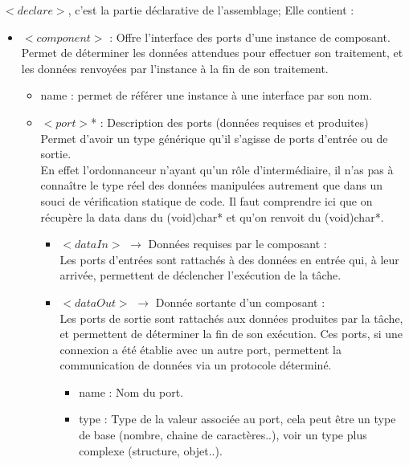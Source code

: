 \documentclass{article}
\begin{document}
$<declare>$, c'est la partie déclarative de l'assemblage; Elle contient :
\begin{itemize}
    \item $<component>$ :
    Offre l'interface des ports d'une instance de composant.\\
    Permet de déterminer les données attendues pour effectuer son traitement, et les données renvoyées par l'instance à la fin de son traitement. %
    \begin{itemize}
        \item name : permet de référer une instance à une interface par son nom.
        \item $<port>$* : Description des ports (données requises et produites)
        Permet d'avoir un type générique qu'il s'agisse de ports d'entrée ou de sortie.\\
        En effet l'ordonnanceur n'ayant qu'un rôle d'intermédiaire, il n'as pas à connaître le type réel des données manipulées autrement que dans un souci de vérification statique de code.
        Il faut comprendre ici que on récupère la data dans du (void)char* et qu'on renvoit du (void)char*.\\
        \begin{itemize}
            \item $<dataIn>$ $\rightarrow$ Données requises par le composant :\\
            Les ports d’entrées sont rattachés à des données en entrée qui, à leur arrivée, permettent de déclencher l’exécution de la tâche.

            \item $<dataOut>$ $\rightarrow$ Donnée sortante d'un composant  :\\
            Les ports de sortie sont rattachés aux données produites par la tâche, et permettent de déterminer la fin de son exécution. Ces ports, si une connexion a été établie avec un autre port, permettent la communication de données via un protocole déterminé.
            \begin{itemize}
                \item name : Nom du port.
                \item type : Type de la valeur associée au port, cela peut être un type de base (nombre, chaine de caractères..), voir un type plus complexe (structure, objet..).
            \end{itemize}
        \end{itemize}
    \end{itemize}


\end{itemize}
\end{document}
